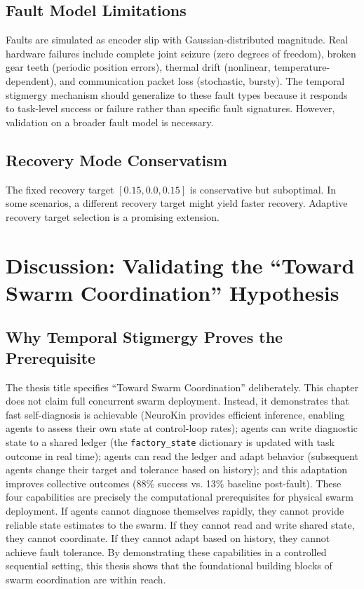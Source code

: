\documentclass[12pt,a4paper,oneside]{report}
\begin{document}
\subsection{Fault Model Limitations}

Faults are simulated as encoder slip with Gaussian-distributed magnitude. Real hardware failures include complete joint seizure (zero degrees of freedom), broken gear teeth (periodic position errors), thermal drift (nonlinear, temperature-dependent), and communication packet loss (stochastic, bursty). The temporal stigmergy mechanism should generalize to these fault types because it responds to task-level success or failure rather than specific fault signatures. However, validation on a broader fault model is necessary.

\subsection{Recovery Mode Conservatism}

The fixed recovery target $[0.15, 0.0, 0.15]$ is conservative but suboptimal. In some scenarios, a different recovery target might yield faster recovery. Adaptive recovery target selection is a promising extension.

\section{Discussion: Validating the ``Toward Swarm Coordination'' Hypothesis}

\subsection{Why Temporal Stigmergy Proves the Prerequisite}

The thesis title specifies ``Toward Swarm Coordination'' deliberately. This chapter does not claim full concurrent swarm deployment. Instead, it demonstrates that fast self-diagnosis is achievable (NeuroKin provides efficient inference, enabling agents to assess their own state at control-loop rates); agents can write diagnostic state to a shared ledger (the \texttt{factory\_state} dictionary is updated with task outcome in real time); agents can read the ledger and adapt behavior (subsequent agents change their target and tolerance based on history); and this adaptation improves collective outcomes (88\% success vs. 13\% baseline post-fault). These four capabilities are precisely the computational prerequisites for physical swarm deployment. If agents cannot diagnose themselves rapidly, they cannot provide reliable state estimates to the swarm. If they cannot read and write shared state, they cannot coordinate. If they cannot adapt based on history, they cannot achieve fault tolerance. By demonstrating these capabilities in a controlled sequential setting, this thesis shows that the foundational building blocks of swarm coordination are within reach.
\end{document}
